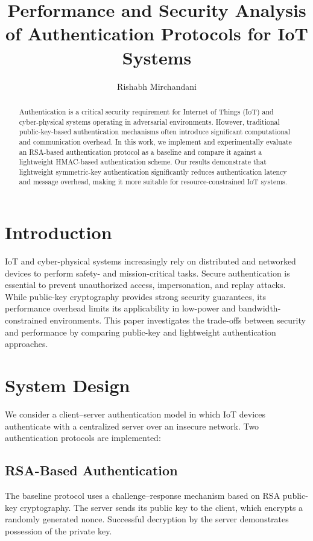 \documentclass[11pt]{article}
\title{Performance and Security Analysis of Authentication Protocols for IoT Systems}
\author{Rishabh Mirchandani}
\date{}
\begin{document}
\maketitle

\begin{abstract}
Authentication is a critical security requirement for Internet of Things (IoT) and cyber-physical systems operating in adversarial environments. However, traditional public-key-based authentication mechanisms often introduce significant computational and communication overhead. In this work, we implement and experimentally evaluate an RSA-based authentication protocol as a baseline and compare it against a lightweight HMAC-based authentication scheme. Our results demonstrate that lightweight symmetric-key authentication significantly reduces authentication latency and message overhead, making it more suitable for resource-constrained IoT systems.
\end{abstract}

\section{Introduction}
IoT and cyber-physical systems increasingly rely on distributed and networked devices to perform safety- and mission-critical tasks. Secure authentication is essential to prevent unauthorized access, impersonation, and replay attacks. While public-key cryptography provides strong security guarantees, its performance overhead limits its applicability in low-power and bandwidth-constrained environments. This paper investigates the trade-offs between security and performance by comparing public-key and lightweight authentication approaches.

\section{System Design}
We consider a client--server authentication model in which IoT devices authenticate with a centralized server over an insecure network. Two authentication protocols are implemented:

\subsection{RSA-Based Authentication}
The baseline protocol uses a challenge--response mechanism based on RSA public-key cryptography. The server sends its public key to the client, which encrypts a randomly generated nonce. Successful decryption by the server demonstrates possession of the private key.
\end{document}
